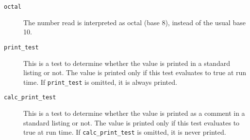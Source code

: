 \begin{description}
\item[{\tt octal}]
The number read is interpreted as octal (base 8), instead of the usual
base 10.

\item[{\tt print\_test}]
This is a test to determine whether the value is printed in a standard
listing or not.  The value is printed only if this test evaluates to
true at run time.  If {\tt print\_test} is omitted, it is always
printed.

\item[{\tt calc\_print\_test}]
This is a test to determine whether the value is printed as a comment
in a standard listing or not.  The value is printed only if this test
evaluates to true at run time.  If {\tt calc\_print\_test} is omitted,
it is never printed.

\end{description}
